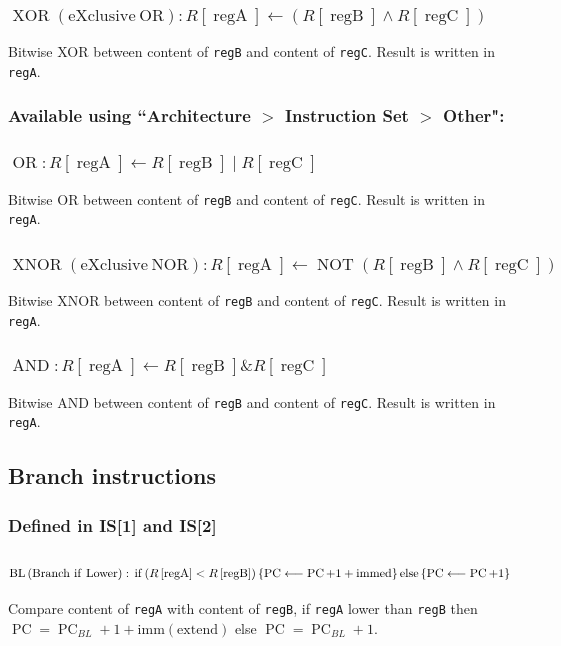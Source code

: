 \documentclass[10pt,a4paper]{article}
\theoremstyle{definition}%
\newcommand{\on}[1]{\operatorname{#1}}
\newcommand{\reg}[1]{\texttt{reg#1}}
\begin{document}
\subsubsection{$\on{XOR} \on{(eXclusive~ OR)}: R\left[ \on{regA} \right] \longleftarrow   \left( R\left[ \on{regB} \right] \wedge R\left[ \on{regC} \right]\right) $}
Bitwise XOR between content of \reg{B} and content of \reg{C}. Result is written in \reg{A}.


\subsubsection*{ Available using ``Architecture $>$ Instruction Set $>$ Other":}

\subsubsection{$\on{OR}: R\left[ \on{regA} \right] \longleftarrow    R\left[ \on{regB} \right] \mid R\left[ \on{regC} \right] $}
Bitwise OR between content of \reg{B} and content of \reg{C}. Result is written in \reg{A}.

\subsubsection{$\on{XNOR} \on{(eXclusive~ NOR)}: R\left[ \on{regA} \right] \longleftarrow  \on{NOT} \left( R\left[ \on{regB} \right] \wedge R\left[ \on{regC} \right]\right) $}
Bitwise XNOR between content of \reg{B} and content of \reg{C}. Result is written in \reg{A}.

\subsubsection{$\on{AND}: R\left[ \on{regA} \right] \longleftarrow    R\left[ \on{regB} \right] \& R\left[ \on{regC} \right] $}
Bitwise AND between content of \reg{B} and content of \reg{C}. Result is written in \reg{A}.

\subsection{Branch instructions}
\subsubsection*{ Defined in IS[1] and IS[2]}
\subsubsection{$\on{BL} \on{(Branch~if~Lower)}:\newline \on{if} \left( R\left[ \on{regA} \right] < R\left[ \on{regB} \right]\right) \left\lbrace\on{PC} \longleftarrow \on{PC}+1+\on{immed} \right\rbrace\on{else} \left\lbrace\on{PC} \longleftarrow \on{PC}+1\right\rbrace $}
Compare content of \reg{A} with content of \reg{B}, if \reg{A} lower than \reg{B} then\\$\on{PC}=\on{PC}_{BL}+1+\on{imm(extend)}$ else $\on{PC}=\on{PC}_{BL}+1$.
\end{document}
